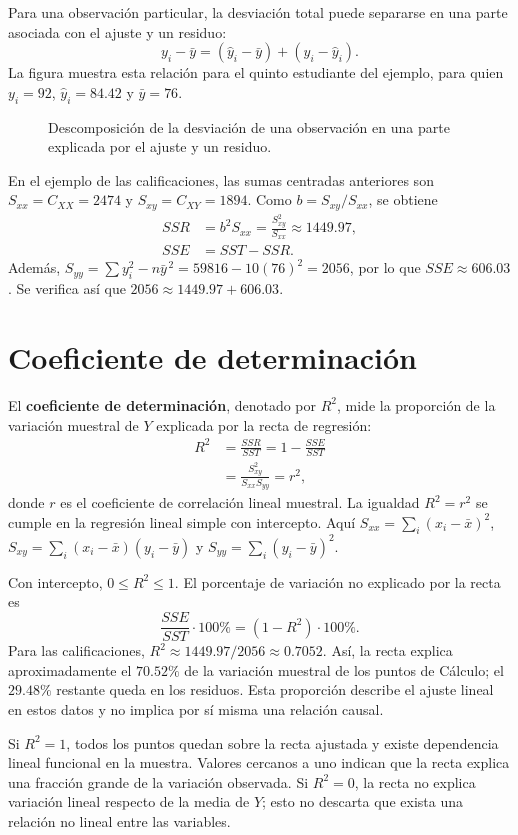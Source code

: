 Para una observación particular, la desviación total puede separarse en una parte asociada con el ajuste y un residuo:
\[
y_i-\bar y=(\widehat y_i-\bar y)+(y_i-\widehat y_i).
\]
La figura muestra esta relación para el quinto estudiante del ejemplo, para quien $y_i=92$, $\widehat y_i=84.42$ y $\bar y=76$.

\begin{figure}[H]
\centering

\caption{Descomposición de la desviación de una observación en una parte explicada por el ajuste y un residuo.}
\label{fig:descomposicion-variacion}
\end{figure}

En el ejemplo de las calificaciones, las sumas centradas anteriores son $S_{xx}=C_{XX}=2474$ y $S_{xy}=C_{XY}=1894$. Como $b=S_{xy}/S_{xx}$, se obtiene
\begin{align*}
SSR&=b^2S_{xx}=\frac{S_{xy}^2}{S_{xx}}\approx1449.97,\\
SSE&=SST-SSR.
\end{align*}
Además, $S_{yy}=\sum y_i^2-n\bar y^{\,2}=59816-10(76)^2=2056$, por lo que $SSE\approx606.03$. Se verifica así que $2056\approx1449.97+606.03$.

\section{Coeficiente de determinación}

El \textbf{coeficiente de determinación}, denotado por $R^2$, mide la proporción de la variación muestral de $Y$ explicada por la recta de regresión:
\begin{align*}
R^2&=\frac{SSR}{SST}
=1-\frac{SSE}{SST}\\
&=\frac{S_{xy}^2}{S_{xx}S_{yy}}
=r^2,
\end{align*}
donde $r$ es el coeficiente de correlación lineal muestral. La igualdad $R^2=r^2$ se cumple en la regresión lineal simple con intercepto. Aquí $S_{xx}=\sum_i(x_i-\bar x)^2$, $S_{xy}=\sum_i(x_i-\bar x)(y_i-\bar y)$ y $S_{yy}=\sum_i(y_i-\bar y)^2$.

Con intercepto, $0\leq R^2\leq1$. El porcentaje de variación no explicado por la recta es
\[
\frac{SSE}{SST}\cdot100\%=(1-R^2)\cdot100\%.
\]
Para las calificaciones, $R^2\approx1449.97/2056\approx0.7052$. Así, la recta explica aproximadamente el $70.52\%$ de la variación muestral de los puntos de Cálculo; el $29.48\%$ restante queda en los residuos. Esta proporción describe el ajuste lineal en estos datos y no implica por sí misma una relación causal.

Si $R^2=1$, todos los puntos quedan sobre la recta ajustada y existe dependencia lineal funcional en la muestra. Valores cercanos a uno indican que la recta explica una fracción grande de la variación observada. Si $R^2=0$, la recta no explica variación lineal respecto de la media de $Y$; esto no descarta que exista una relación no lineal entre las variables.